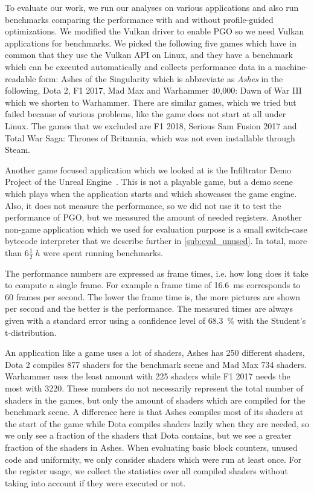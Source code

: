 \clearpage
{}
To evaluate our work, we run our analyses on various applications and also run benchmarks comparing the performance with and without profile-guided optimizations.
We modified the Vulkan driver to enable PGO so we need Vulkan applications for benchmarks.
We picked the following five games which have in common that they use the Vulkan API on Linux, and they have a benchmark which can be executed automatically and collects performance data in a machine-readable form:
Ashes of the Singularity which is abbreviate as \emph{Ashes} in the following, Dota 2, F1 2017, Mad Max and Warhammer 40,000: Dawn of War III which we shorten to Warhammer.
There are similar games, which we tried but failed because of various problems, like the game does not start at all under Linux.
The games that we excluded are F1 2018, Serious Sam Fusion 2017 and Total War Saga: Thrones of Britannia, which was not even installable through Steam.

Another game focused application which we looked at is the Infiltrator Demo Project of the Unreal Engine~\cite{Games2015}.
This is not a playable game, but a demo scene which plays when the application starts and which showcases the game engine.
Also, it does not measure the performance, so we did not use it to test the performance of PGO, but we measured the amount of needed registers.
Another non-game application which we used for evaluation purpose is a small switch-case bytecode interpreter that we describe further in \cref{sub:eval_unused}.
In total, more than $6 \frac{1}{2}\;\si{h}$ were spent running benchmarks.

The performance numbers are expressed as frame times, i.e. how long does it take to compute a single frame.
For example a frame time of \SI{16.6}{\milli\second} corresponds to 60 frames per second.
The lower the frame time is, the more pictures are shown per second and the better is the performance.
The measured times are always given with a standard error using a confidence level of \SI{68.3}{\percent} with the Student's t-distribution.

An application like a game uses a lot of shaders, Ashes has 250 different shaders, Dota 2 compiles 877 shaders for the benchmark scene and Mad Max 734 shaders.
Warhammer uses the least amount with 225 shaders while F1 2017 needs the most with 3220.
These numbers do not necessarily represent the total number of shaders in the games, but only the amount of shaders which are compiled for the benchmark scene.
A difference here is that Ashes compiles most of its shaders at the start of the game while Dota compiles shaders lazily when they are needed, so we only see a fraction of the shaders that Dota contains, but we see a greater fraction of the shaders in Ashes.
When evaluating basic block counters, unused code and uniformity, we only consider shaders which were run at least once.
For the register usage, we collect the statistics over all compiled shaders without taking into account if they were executed or not.

